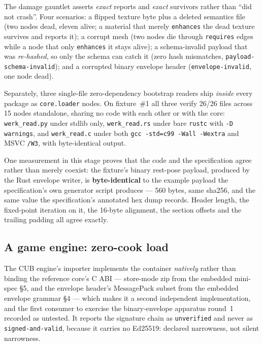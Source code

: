 \documentclass[10pt,twocolumn,letterpaper]{article}
\newcommand{\code}[1]{\texttt{\small #1}}
\begin{document}
The damage gauntlet asserts \emph{exact} reports and \emph{exact} survivors rather
than ``did not crash''. Four scenarios: a flipped texture byte plus a deleted
semantics file (two nodes dead, eleven alive; a material that merely
\code{enhances} the dead texture survives and reports it); a corrupt mesh (two
nodes die through \code{requires} edges while a node that only \code{enhances} it
stays alive); a schema-invalid payload that was \emph{re-hashed}, so only the
schema can catch it (zero hash mismatches, \code{payload-schema-invalid}); and a
corrupted binary envelope header (\code{envelope-invalid}, one node dead).

Separately, three single-file zero-dependency bootstrap readers ship \emph{inside}
every package as \code{core.loader} nodes. On fixture~\#1 all three verify 26/26
files across 15 nodes standalone, sharing no code with each other or with the
core: \code{werk\_read.py} under stdlib only, \code{werk\_read.rs} under bare
\code{rustc} with \code{-D warnings}, and \code{werk\_read.c} under both
\code{gcc -std=c99 -Wall -Wextra} and MSVC \code{/W3}, with byte-identical output.

One measurement in this stage proves that the code and the specification agree
rather than merely coexist: the fixture's binary rest-pose payload, produced by
the Rust envelope writer, is \textbf{byte-identical} to the example payload the
specification's own generator script produces --- 560 bytes, same sha256, and the
same value the specification's annotated hex dump records. Header length, the
fixed-point iteration on it, the 16-byte alignment, the section offsets and the
trailing padding all agree exactly.

\subsection{A game engine: zero-cook load}
\label{sec:cub}

The CUB engine's importer implements the container \emph{natively} rather than
binding the reference core's C ABI --- store-mode zip from the embedded mini-spec
\S5, and the envelope header's MessagePack subset from the embedded envelope
grammar \S4 --- which makes it a second independent implementation, and the first
consumer to exercise the binary-envelope apparatus round~1 recorded as untested.
It reports the signature chain as \code{unverified} and never as
\code{signed-and-valid}, because it carries no Ed25519: declared narrowness, not
silent narrowness.
\end{document}
